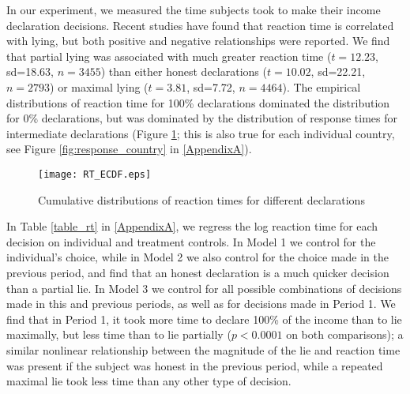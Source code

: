 \documentclass[12pt]{article}
\begin{document}
 
\par In our experiment, we measured the time subjects took to make their income declaration decisions. Recent studies have found that reaction time is correlated with lying, but both positive and negative relationships were reported.\footnotemark{}
We find that partial lying was associated with much greater reaction time ($t=12.23$, sd=18.63, $n=3455$) than either honest declarations ($t=10.02$, sd=22.21, $n=2793$) or maximal lying ($t=3.81$, sd=7.72, $n=4464$). The empirical distributions of reaction time for 100\% declarations dominated the distribution for 0\% declarations, but was dominated by the distribution of response times for intermediate declarations (Figure \ref{fig:response}; this is also true for each individual country, see Figure \ref{fig:response_country} in \ref{AppendixA}). \label{stata:rt}

\begin{comment}
\begin{figure}[!htb]
\subfigure[Distribution of reaction time]{
\texttt{[image: response.eps]}
\label{fig:response}
}
\subfigure[Reaction time depending on fraction declared in the current and previous periods]{
\texttt{[image: response\_bar.eps]}
\label{fig:response_bar}
}
\caption{Reaction time}
\end{figure}
\end{comment}


\begin{figure}[!htb]
\centerline{\texttt{[image: RT\_ECDF.eps]}}
\caption{Cumulative distributions of reaction times for different declarations}\label{fig:response}
\end{figure}

\par In Table \ref{table_rt} in \ref{AppendixA}, we regress the log reaction time for each decision on individual and treatment controls. In Model 1 we control for the individual's choice, while in Model 2 we also control for the choice made in the previous period, and find that an honest declaration is a much quicker decision than a partial lie. In Model 3 we control for all possible combinations of decisions made in this and previous periods, as well as for decisions made in Period 1. We find that in Period 1, it took more time to declare 100\% of the income than to lie maximally, but less time than to lie partially ($p<0.0001$ on both comparisons); a similar nonlinear relationship between the magnitude of the lie and reaction time was 
present if the subject was honest in the previous period, while a repeated maximal lie took less time than any other type of decision.\footnotemark{}  
\end{document}
